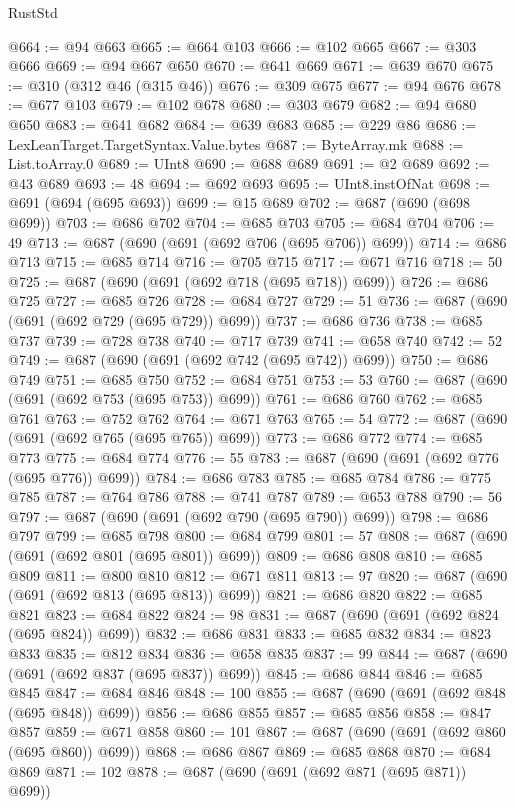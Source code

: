 \begin{lexlean}{RustStd}
\begin{coremodule}
@664 := @94 @663
@665 := @664 @103
@666 := @102 @665
@667 := @303 @666
@669 := @94 @667 @650
@670 := @641 @669
@671 := @639 @670
@675 := @310 (@312 @46 (@315 @46))
@676 := @309 @675
@677 := @94 @676
@678 := @677 @103
@679 := @102 @678
@680 := @303 @679
@682 := @94 @680 @650
@683 := @641 @682
@684 := @639 @683
@685 := @229 @86
@686 := LexLeanTarget.TargetSyntax.Value.bytes
@687 := ByteArray.mk
@688 := List.toArray.{0}
@689 := UInt8
@690 := @688 @689
@691 := @2 @689
@692 := @43 @689
@693 := 48
@694 := @692 @693
@695 := UInt8.instOfNat
@698 := @691 (@694 (@695 @693))
@699 := @15 @689
@702 := @687 (@690 (@698 @699))
@703 := @686 @702
@704 := @685 @703
@705 := @684 @704
@706 := 49
@713 := @687 (@690 (@691 (@692 @706 (@695 @706)) @699))
@714 := @686 @713
@715 := @685 @714
@716 := @705 @715
@717 := @671 @716
@718 := 50
@725 := @687 (@690 (@691 (@692 @718 (@695 @718)) @699))
@726 := @686 @725
@727 := @685 @726
@728 := @684 @727
@729 := 51
@736 := @687 (@690 (@691 (@692 @729 (@695 @729)) @699))
@737 := @686 @736
@738 := @685 @737
@739 := @728 @738
@740 := @717 @739
@741 := @658 @740
@742 := 52
@749 := @687 (@690 (@691 (@692 @742 (@695 @742)) @699))
@750 := @686 @749
@751 := @685 @750
@752 := @684 @751
@753 := 53
@760 := @687 (@690 (@691 (@692 @753 (@695 @753)) @699))
@761 := @686 @760
@762 := @685 @761
@763 := @752 @762
@764 := @671 @763
@765 := 54
@772 := @687 (@690 (@691 (@692 @765 (@695 @765)) @699))
@773 := @686 @772
@774 := @685 @773
@775 := @684 @774
@776 := 55
@783 := @687 (@690 (@691 (@692 @776 (@695 @776)) @699))
@784 := @686 @783
@785 := @685 @784
@786 := @775 @785
@787 := @764 @786
@788 := @741 @787
@789 := @653 @788
@790 := 56
@797 := @687 (@690 (@691 (@692 @790 (@695 @790)) @699))
@798 := @686 @797
@799 := @685 @798
@800 := @684 @799
@801 := 57
@808 := @687 (@690 (@691 (@692 @801 (@695 @801)) @699))
@809 := @686 @808
@810 := @685 @809
@811 := @800 @810
@812 := @671 @811
@813 := 97
@820 := @687 (@690 (@691 (@692 @813 (@695 @813)) @699))
@821 := @686 @820
@822 := @685 @821
@823 := @684 @822
@824 := 98
@831 := @687 (@690 (@691 (@692 @824 (@695 @824)) @699))
@832 := @686 @831
@833 := @685 @832
@834 := @823 @833
@835 := @812 @834
@836 := @658 @835
@837 := 99
@844 := @687 (@690 (@691 (@692 @837 (@695 @837)) @699))
@845 := @686 @844
@846 := @685 @845
@847 := @684 @846
@848 := 100
@855 := @687 (@690 (@691 (@692 @848 (@695 @848)) @699))
@856 := @686 @855
@857 := @685 @856
@858 := @847 @857
@859 := @671 @858
@860 := 101
@867 := @687 (@690 (@691 (@692 @860 (@695 @860)) @699))
@868 := @686 @867
@869 := @685 @868
@870 := @684 @869
@871 := 102
@878 := @687 (@690 (@691 (@692 @871 (@695 @871)) @699))

\end{coremodule}
\end{lexlean}
